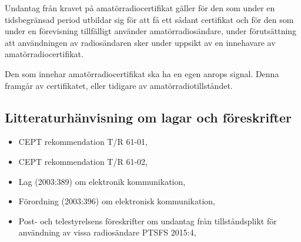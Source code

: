 Undantag från kravet på amatörradiocertifikat gäller för den som under en
tidsbegränsad period utbildar sig för att få ett sådant certifikat och för
den som under en förevisning tillfälligt använder amatörradiosändare, under
förutsättning att användningen av radiosändaren sker under uppsikt av en
innehavare av amatörradiocertifikat.

Den som innehar amatörradiocertifikat ska ha en egen anrops signal.
Denna framgår av certifikatet, eller tidigare av amatörradiotillståndet.

\subsection{Litteraturhänvisning om lagar och föreskrifter}

\begin{itemize}
\item CEPT rekommendation T/R 61-01,
\item CEPT rekommendation T/R 61-02,
\item Lag (2003:389) om elektronik kommunikation,
\item Förordning (2003:396) om elektronisk kommunikation,
\item Post- och telestyrelsens föreskrifter om undantag från tillståndsplikt för
användning av vissa radiosändare PTSFS 2015:4,
\end{itemize}


